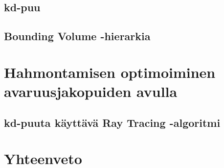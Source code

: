 \documentclass[a4paper,12pt, titlepage]{article}
\begin{document}
\subsection{kd-puu}
\subsection{Bounding Volume -hierarkia}

\newpage
\section{Hahmontamisen optimoiminen avaruusjakopuiden avulla}
\subsection{kd-puuta käyttävä Ray Tracing -algoritmi}
\citep{havran}

\section{Yhteenveto}

\clearpage

\listofalgorithms
\end{document}
